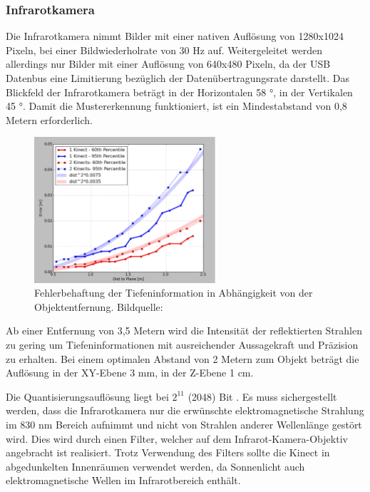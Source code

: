 \subsubsection{Infrarotkamera}
Die Infrarotkamera nimmt Bilder mit einer nativen Auflösung von 1280x1024 Pixeln, bei einer Bildwiederholrate von 30 Hz auf. Weitergeleitet werden allerdings nur Bilder mit einer Auflösung von 640x480 Pixeln, da der USB Datenbus eine Limitierung bezüglich der Datenübertragungsrate darstellt\cite{borenstein2012making}. Das Blickfeld der Infrarotkamera beträgt in der Horizontalen 58 °, in der Vertikalen 45 °. Damit die Mustererkennung funktioniert, ist ein Mindestabstand von 0,8 Metern erforderlich.\cite{borenstein2012making} \\
 \begin{figure}[!ht]
 	\begin{center}
 		\includegraphics[width=0.6\textwidth]{./Res/Res_to_Dist}
 	\end{center}
 	\caption{Fehlerbehaftung der Tiefeninformation in Abhängigkeit von der Objektentfernung. Bildquelle: \cite{kinectinfo}}
 	\label{fig:Res_to_Dist}
 \end{figure}
 
 Ab einer Entfernung von 3,5 Metern wird die Intensität der reflektierten Strahlen zu gering um Tiefeninformationen mit ausreichender Aussagekraft und Präzision zu erhalten.
Bei einem optimalen Abstand von 2 Metern zum Objekt beträgt die Auflösung 
in der XY-Ebene 3 mm, in der Z-Ebene 1 cm.





Die Quantisierungsauflösung liegt bei $2^ {11}$ (2048) Bit \cite{microsoftdocu}.
Es muss sichergestellt werden, dass die Infrarotkamera nur die erwünschte elektromagnetische Strahlung im 830 nm Bereich aufnimmt und nicht von Strahlen anderer Wellenlänge gestört wird. Dies wird durch einen Filter, welcher auf dem Infrarot-Kamera-Objektiv angebracht ist realisiert.
Trotz Verwendung des Filters sollte die Kinect in abgedunkelten Innenräumen verwendet werden, da Sonnenlicht auch elektromagnetische Wellen im Infrarotbereich enthält.

